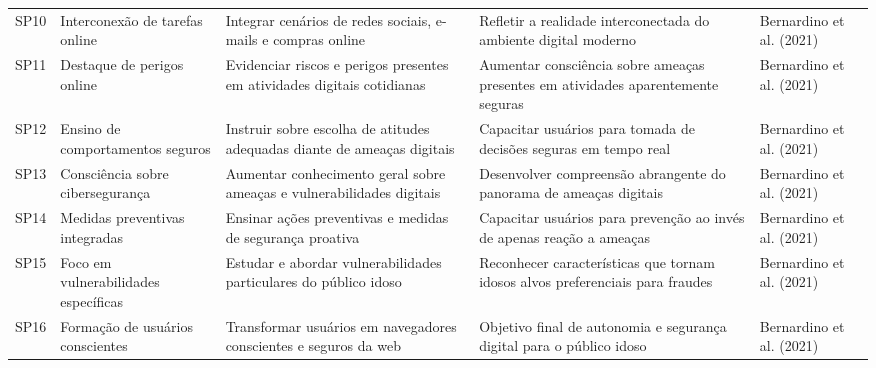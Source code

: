 \begin{table}[H]
\begin{table}[H]
\begin{tabular}{p{0.5cm}p{3cm}p{4cm}p{4cm}p{2.5cm}}
SP10 & Interconexão de tarefas online & Integrar cenários de redes sociais, e-mails e compras online & Refletir a realidade interconectada do ambiente digital moderno & Bernardino et al. (2021) \\
SP11 & Destaque de perigos online & Evidenciar riscos e perigos presentes em atividades digitais cotidianas & Aumentar consciência sobre ameaças presentes em atividades aparentemente seguras & Bernardino et al. (2021) \\
SP12 & Ensino de comportamentos seguros & Instruir sobre escolha de atitudes adequadas diante de ameaças digitais & Capacitar usuários para tomada de decisões seguras em tempo real & Bernardino et al. (2021) \\
SP13 & Consciência sobre cibersegurança & Aumentar conhecimento geral sobre ameaças e vulnerabilidades digitais & Desenvolver compreensão abrangente do panorama de ameaças digitais & Bernardino et al. (2021) \\
SP14 & Medidas preventivas integradas & Ensinar ações preventivas e medidas de segurança proativa & Capacitar usuários para prevenção ao invés de apenas reação a ameaças & Bernardino et al. (2021) \\
SP15 & Foco em vulnerabilidades específicas & Estudar e abordar vulnerabilidades particulares do público idoso & Reconhecer características que tornam idosos alvos preferenciais para fraudes & Bernardino et al. (2021) \\
SP16 & Formação de usuários conscientes & Transformar usuários em navegadores conscientes e seguros da web & Objetivo final de autonomia e segurança digital para o público idoso & Bernardino et al. (2021) \\
\hline
\end{tabular}
\end{table}



\end{table}
